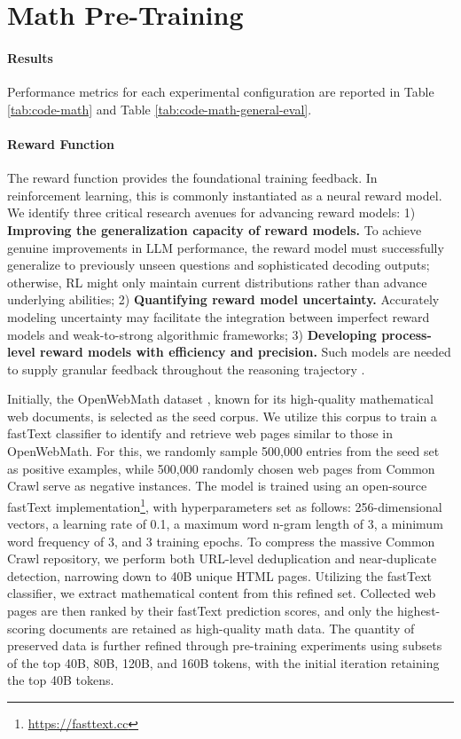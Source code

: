 \section{Math Pre-Training}

\paragraph{Results}
Performance metrics for each experimental configuration are reported in Table \ref{tab:code-math} and Table \ref{tab:code-math-general-eval}.

\paragraph{Reward Function} The reward function provides the foundational training feedback. In reinforcement learning, this is commonly instantiated as a neural reward model. We identify three critical research avenues for advancing reward models: 1) \textbf{Improving the generalization capacity of reward models.} To achieve genuine improvements in LLM performance, the reward model must successfully generalize to previously unseen questions and sophisticated decoding outputs; otherwise, RL might only maintain current distributions rather than advance underlying abilities; 2) \textbf{Quantifying reward model uncertainty.} Accurately modeling uncertainty may facilitate the integration between imperfect reward models and weak-to-strong algorithmic frameworks; 3) \textbf{Developing process-level reward models with efficiency and precision.} Such models are needed to supply granular feedback throughout the reasoning trajectory \citep{lightman2023let,wang2023math}.

Initially, the OpenWebMath dataset \citep{openwebmath}, known for its high-quality mathematical web documents, is selected as the seed corpus. We utilize this corpus to train a fastText classifier \citep{joulin2016fasttext} to identify and retrieve web pages similar to those in OpenWebMath. For this, we randomly sample 500,000 entries from the seed set as positive examples, while 500,000 randomly chosen web pages from Common Crawl serve as negative instances. The model is trained using an open-source fastText implementation\footnote{\url{https://fasttext.cc}}, with hyperparameters set as follows: 256-dimensional vectors, a learning rate of 0.1, a maximum word n-gram length of 3, a minimum word frequency of 3, and 3 training epochs. To compress the massive Common Crawl repository, we perform both URL-level deduplication and near-duplicate detection, narrowing down to 40B unique HTML pages. Utilizing the fastText classifier, we extract mathematical content from this refined set. Collected web pages are then ranked by their fastText prediction scores, and only the highest-scoring documents are retained as high-quality math data. The quantity of preserved data is further refined through pre-training experiments using subsets of the top 40B, 80B, 120B, and 160B tokens, with the initial iteration retaining the top 40B tokens.


